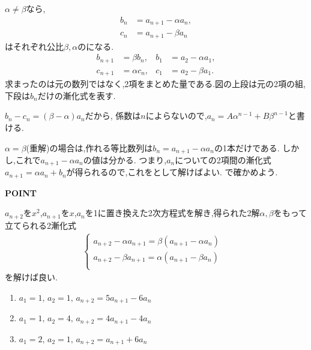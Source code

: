 $\alpha\ne\beta$なら,
\[
  \begin{aligned}
    b_n&=a_{n+1}-\alpha a_n,\\
    c_n&=a_{n+1}-\beta a_n
  \end{aligned}
\]
はそれぞれ公比$\beta,\alpha$のになる.
\begin{align*}
  b_{n+1}&=\beta b_n,& b_1&=a_2-\alpha a_1,\\
  c_{n+1}&=\alpha c_n,& c_1&=a_2-\beta a_1.
\end{align*}
求まったのは元の数列ではなく,2項をまとめた量である.図の上段は元の2項の組,下段は$b_n$だけの漸化式を表す.
\BookFigThreeTerm

$b_n-c_n=(\beta-\alpha)a_n$だから,
\BookMathLayout{\[
    a_n=\frac{(a_2-\alpha a_1)\beta^{n-1}-(a_2-\beta a_1)\alpha^{n-1}}{\beta-\alpha}.
  \]}{\[
    \begin{aligned}
      a_n&=\frac{a_2-\alpha a_1}{\beta-\alpha}\beta^{n-1}\\
      &\quad-\frac{a_2-\beta a_1}{\beta-\alpha}\alpha^{n-1}.
    \end{aligned}
  \]}
係数は$n$によらないので,$a_n=A\alpha^{n-1}+B\beta^{n-1}$と書ける.

$\alpha=\beta$(重解)の場合は,作れる等比数列は$b_n=a_{n+1}-\alpha a_n$の1本だけである.
しかし,これで$a_{n+1}-\alpha a_n$の値は分かる.
つまり,$a_n$についての2項間の漸化式$a_{n+1}=\alpha a_n+b_n$が得られるので,これをとして解けばよい.
で確かめよう.

\begin{bookpoint}
  \textbf{POINT}\par
  $a_{n+2}$を$x^2$,$a_{n+1}$を$x$,$a_n$を1に置き換えた2次方程式を解き,得られた2解$\alpha,\beta$をもって立てられる2漸化式
  \begin{align*}
    \begin{cases}
      a_{n+2}-\alpha a_{n+1}=\beta(a_{n+1}-\alpha a_n) &\\
      a_{n+2}-\beta a_{n+1}=\alpha(a_{n+1}-\beta a_n) &\\
    \end{cases}
  \end{align*}
  を解けば良い.
\end{bookpoint}
\noindent {}\par\nobreak
\begin{enumerate}[label=(\arabic*),parsep=3pt,format=\bookitemlink{example-three-term-1}{problem}{hint}]
  \item $a_1=1,\,a_2=1,\, a_{n+2}=5a_{n+1}-6a_n$
  \item $a_1=1,\,a_2=4,\, a_{n+2}=4a_{n+1}-4a_n$
  \item $a_1=2,\,a_2=1,\, a_{n+2}=a_{n+1}+6a_n$
\end{enumerate}

